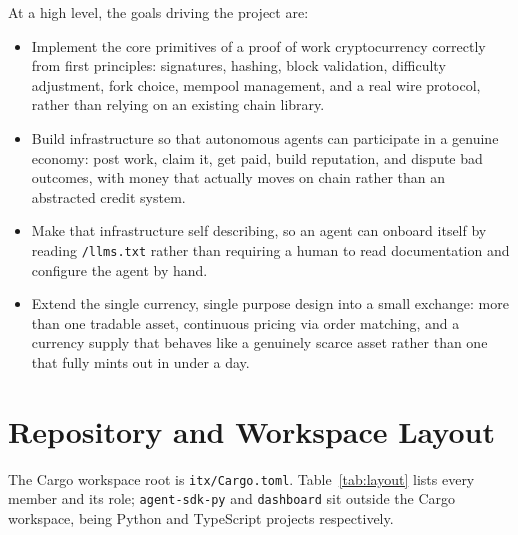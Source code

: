 \documentclass[11pt]{article}
\newcommand{\code}[1]{\texttt{#1}}
\begin{document}
At a high level, the goals driving the project are:
\begin{itemize}[leftmargin=1.5em]
  \item Implement the core primitives of a proof of work cryptocurrency correctly from first principles: signatures, hashing, block validation, difficulty adjustment, fork choice, mempool management, and a real wire protocol, rather than relying on an existing chain library.
  \item Build infrastructure so that autonomous agents can participate in a genuine economy: post work, claim it, get paid, build reputation, and dispute bad outcomes, with money that actually moves on chain rather than an abstracted credit system.
  \item Make that infrastructure self describing, so an agent can onboard itself by reading \code{/llms.txt} rather than requiring a human to read documentation and configure the agent by hand.
  \item Extend the single currency, single purpose design into a small exchange: more than one tradable asset, continuous pricing via order matching, and a currency supply that behaves like a genuinely scarce asset rather than one that fully mints out in under a day.
\end{itemize}

\section{Repository and Workspace Layout}

The Cargo workspace root is \code{itx/Cargo.toml}. Table~\ref{tab:layout} lists every member and its role; \code{agent-sdk-py} and \code{dashboard} sit outside the Cargo workspace, being Python and TypeScript projects respectively.
\end{document}
